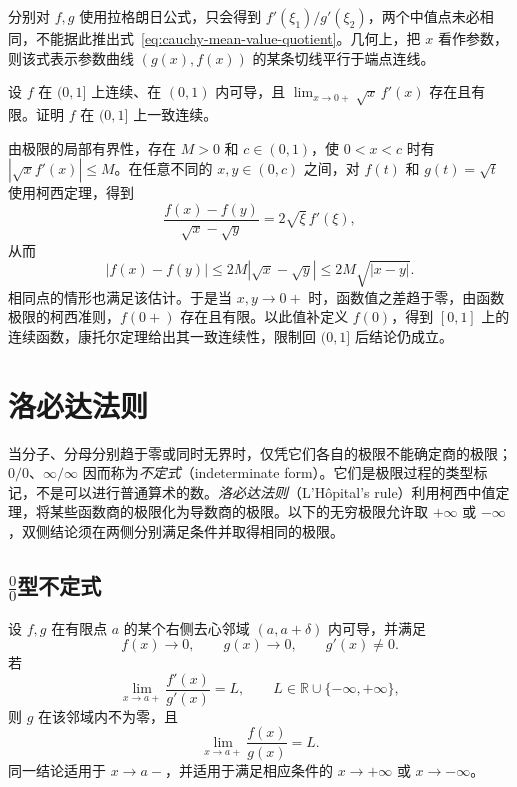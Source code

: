 分别对 $f,g$ 使用拉格朗日公式，只会得到 $f'(\xi_1)/g'(\xi_2)$，两个中值点未必相同，不能据此推出式~\eqref{eq:cauchy-mean-value-quotient}。几何上，把 $x$ 看作参数，则该式表示参数曲线 $(g(x),f(x))$ 的某条切线平行于端点连线。

\begin{example}
\label{ex:cauchy-mean-value-weighted-derivative}
设 $f$ 在 $(0,1]$ 上连续、在 $(0,1)$ 内可导，且 $\lim_{x\to0+}\sqrt{x}\,f'(x)$ 存在且有限。证明 $f$ 在 $(0,1]$ 上一致连续。
\end{example}

\begin{solve}
由极限的局部有界性，存在 $M>0$ 和 $c\in(0,1)$，使 $0<x<c$ 时有 $|\sqrt{x}f'(x)|\leq M$。在任意不同的 $x,y\in(0,c)$ 之间，对 $f(t)$ 和 $g(t)=\sqrt{t}$ 使用柯西定理，得到
\[
    \frac{f(x)-f(y)}{\sqrt{x}-\sqrt{y}}=2\sqrt{\xi}\,f'(\xi),
\]
从而
\[
    |f(x)-f(y)|\leq2M|\sqrt{x}-\sqrt{y}|
    \leq2M\sqrt{|x-y|}.
\]
相同点的情形也满足该估计。于是当 $x,y\to0+$ 时，函数值之差趋于零，由函数极限的柯西准则，$f(0+)$ 存在且有限。以此值补定义 $f(0)$，得到 $[0,1]$ 上的连续函数，康托尔定理给出其一致连续性，限制回 $(0,1]$ 后结论仍成立。
\end{solve}

\section{洛必达法则}
\label{sec:lhopital-rule}

当分子、分母分别趋于零或同时无界时，仅凭它们各自的极限不能确定商的极限；$0/0$、$\infty/\infty$ 因而称为\emph{不定式}（indeterminate form）。它们是极限过程的类型标记，不是可以进行普通算术的数。\emph{洛必达法则}（L'H\^opital's rule）利用柯西中值定理，将某些函数商的极限化为导数商的极限。以下的无穷极限允许取 $+\infty$ 或 $-\infty$，双侧结论须在两侧分别满足条件并取得相同的极限。

\subsection{\texorpdfstring{$\frac{0}{0}$}{0/0}型不定式}
\label{subsec:zero-over-zero-indeterminate-form}

\begin{theorem}[$0/0$ 型洛必达法则]
\label{thm:lhopital-zero-over-zero}
设 $f,g$ 在有限点 $a$ 的某个右侧去心邻域 $(a,a+\delta)$ 内可导，并满足
\[
    f(x)\to0,\qquad g(x)\to0,\qquad g'(x)\neq0.
\]
若
\[
    \lim_{x\to a+}\frac{f'(x)}{g'(x)}=L,
    \qquad L\in\mathbb{R}\cup\{-\infty,+\infty\},
\]
则 $g$ 在该邻域内不为零，且
\begin{equation}
    \lim_{x\to a+}\frac{f(x)}{g(x)}=L.
    \label{eq:lhopital-zero-over-zero}
\end{equation}
同一结论适用于 $x\to a-$，并适用于满足相应条件的 $x\to+\infty$ 或 $x\to-\infty$。
\end{theorem}


